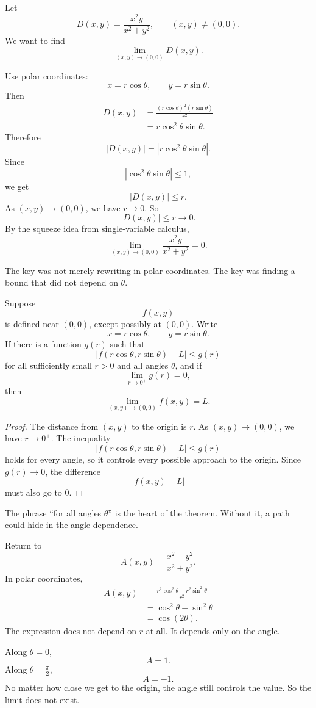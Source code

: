 \begin{example}
Let
\[
    D(x,y)=\frac{x^2y}{x^2+y^2},
    \qquad (x,y)\ne(0,0).
\]
We want to find
\[
    \lim_{(x,y)\to(0,0)}D(x,y).
\]

Use polar coordinates:
\[
    x=r\cos\theta,\qquad y=r\sin\theta.
\]
Then
\[
\begin{aligned}
D(x,y)
&=
\frac{(r\cos\theta)^2(r\sin\theta)}{r^2} \\
&=
r\cos^2\theta\sin\theta.
\end{aligned}
\]
Therefore
\[
    |D(x,y)|
    =
    |r\cos^2\theta\sin\theta|.
\]
Since
\[
    |\cos^2\theta\sin\theta|\le1,
\]
we get
\[
    |D(x,y)|\le r.
\]
As \((x,y)\to(0,0)\), we have \(r\to0\).  So
\[
    |D(x,y)|\le r\to0.
\]
By the squeeze idea from single-variable calculus,
\[
\boxed{
    \lim_{(x,y)\to(0,0)}\frac{x^2y}{x^2+y^2}=0.
}
\]
\end{example}

The key was not merely rewriting in polar coordinates.  The key was finding a bound
that did not depend on \(\theta\).

\begin{theorem}
Suppose
\[
    f(x,y)
\]
is defined near \((0,0)\), except possibly at \((0,0)\).  Write
\[
    x=r\cos\theta,\qquad y=r\sin\theta.
\]
If there is a function \(g(r)\) such that
\[
    |f(r\cos\theta,r\sin\theta)-L|\le g(r)
\]
for all sufficiently small \(r>0\) and all angles \(\theta\), and if
\[
    \lim_{r\to0^+}g(r)=0,
\]
then
\[
\boxed{
    \lim_{(x,y)\to(0,0)}f(x,y)=L.
}
\]
\end{theorem}

\begin{proof}
The distance from \((x,y)\) to the origin is \(r\).  As \((x,y)\to(0,0)\), we have
\(r\to0^+\).  The inequality
\[
    |f(r\cos\theta,r\sin\theta)-L|\le g(r)
\]
holds for every angle, so it controls every possible approach to the origin.  Since
\(g(r)\to0\), the difference
\[
    |f(x,y)-L|
\]
must also go to \(0\).
\end{proof}

The phrase ``for all angles \(\theta\)'' is the heart of the theorem.  Without it, a path
could hide in the angle dependence.

\begin{example}
Return to
\[
    A(x,y)=\frac{x^2-y^2}{x^2+y^2}.
\]
In polar coordinates,
\[
\begin{aligned}
    A(x,y)
    &=
    \frac{r^2\cos^2\theta-r^2\sin^2\theta}{r^2} \\
    &=
    \cos^2\theta-\sin^2\theta \\
    &=
    \cos(2\theta).
\end{aligned}
\]
The expression does not depend on \(r\) at all.  It depends only on the angle.

Along \(\theta=0\),
\[
    A=1.
\]
Along \(\theta=\frac{\pi}{2}\),
\[
    A=-1.
\]
No matter how close we get to the origin, the angle still controls the value.  So the
limit does not exist.
\end{example}

